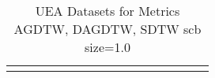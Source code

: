 {\tiny
	\begin{longtable}{|l|ccccc|ccccc|ccccc|}

		\hline
		\caption{UEA Datasets for Metrics AGDTW, DAGDTW, SDTW \gls{scb} size=1.0}
		\label{tab:UEA_agdtw-dagdtw-sdtw_scb_size=1.0}
	\end{longtable}
}
